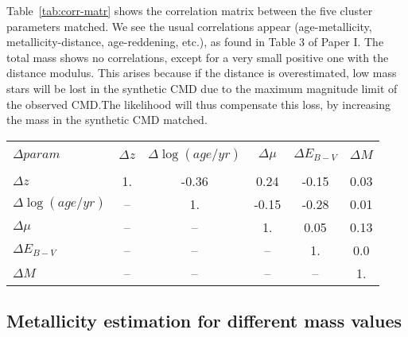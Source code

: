 \documentclass[draft]{aa}
\begin{document}
\begin{appendix}
Table~\ref{tab:corr-matr} shows the correlation matrix between the five cluster
parameters matched. We see the usual correlations appear (age-metallicity,
metallicity-distance, age-reddening, etc.), as found in Table 3 of Paper I. The
total mass shows no correlations, except for a very small positive one with the
distance modulus. This arises because if the distance is overestimated, low mass
stars will be lost in the synthetic CMD due to the maximum magnitude limit of
the observed CMD.\@ The likelihood will thus compensate this loss, by increasing
the mass in the synthetic CMD matched.

\begin{table*}
\centering
\caption{Correlation matrix for parameter deltas, defined for each cluster in
the sense \texttt{ASteCA} minus MASSCLEAN.}
\label{tab:corr-matr}
\begin{tabular}{lccccc}
\hline
\hline\\[-1.85ex]
$\Delta param$ & $\Delta z$ & $\Delta \log(age/yr)$ & $\Delta \mu$ &
$\Delta E_{B-V}$ & $\Delta M$ \\
\hline\\[-1.85ex]
$\Delta z$            &  1. & -0.36 & 0.24  & -0.15 & 0.03 \\
$\Delta \log(age/yr)$ &  -- & 1.    & -0.15 & -0.28 & 0.01 \\
$\Delta \mu$          &  -- & --    & 1.    & 0.05  & 0.13 \\
$\Delta E_{B-V}$      &  -- & --    & --    & 1.    & 0.0\\
$\Delta M$            &  -- & --    & --    & --    & 1. \\
\hline
\end{tabular}
\end{table*}




\subsection{Metallicity estimation for different mass values}
\label{apdx:ssec:metallicity}


\end{appendix}
\end{document}
